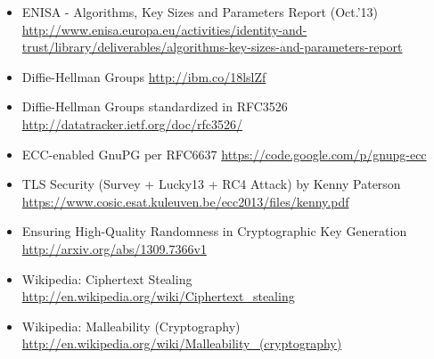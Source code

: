 \begin{itemize}
\item ENISA - Algorithms, Key Sizes and Parameters Report (Oct.'13) \url{http://www.enisa.europa.eu/activities/identity-and-trust/library/deliverables/algorithms-key-sizes-and-parameters-report}
\item Diffie-Hellman Groups \url{http://ibm.co/18lslZf}
\item Diffie-Hellman Groups standardized in RFC3526\cite{rfc3526} \url{http://datatracker.ietf.org/doc/rfc3526/}
\item ECC-enabled GnuPG per RFC6637\cite{rfc6637} \url{https://code.google.com/p/gnupg-ecc}
\item TLS Security (Survey + Lucky13 + RC4 Attack) by Kenny Paterson \url{https://www.cosic.esat.kuleuven.be/ecc2013/files/kenny.pdf}
\item Ensuring High-Quality Randomness in Cryptographic Key Generation \url{http://arxiv.org/abs/1309.7366v1}
\item Wikipedia: Ciphertext Stealing \url{http://en.wikipedia.org/wiki/Ciphertext_stealing}
\item Wikipedia: Malleability (Cryptography) \url{http://en.wikipedia.org/wiki/Malleability_(cryptography)}
\end{itemize}
